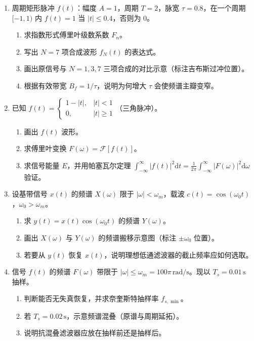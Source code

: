 \documentclass[11pt,a4paper]{ctexart}
\newcommand{\FT}{\mathcal{F}}
\newcommand{\dd}{\mathrm{d}}
\begin{document}
\begin{enumerate}[label=\textbf{题\arabic*.},leftmargin=*,itemsep=1.2em,start=8]

\item \label{q:8}
周期矩形脉冲 $f(t)$：幅度 $A=1$，周期 $T=2$，脉宽 $\tau=0.8$，在一个周期 $[-1,1)$ 内 $f(t)=1$ 当 $|t|\le 0.4$，否则为 $0$。
\begin{enumerate}[label=(\alph*)]
    \item 求指数形式傅里叶级数系数 $F_n$。
    \item 写出 $N=7$ 项合成波形 $f_N(t)$ 的表达式。
    \item 画出原信号与 $N=1,3,7$ 三项合成的对比示意（标注吉布斯过冲位置）。
    \item 根据有效带宽 $B_f=1/\tau$，说明为何增大 $\tau$ 会使频谱主瓣变窄。
\end{enumerate}

\item \label{q:9}
已知 $f(t)=\begin{cases}1-|t|,&|t|<1\\0,&|t|\ge 1\end{cases}$（三角脉冲）。
\begin{enumerate}[label=(\alph*)]
    \item 画出 $f(t)$ 波形。
    \item 求傅里叶变换 $F(\omega)=\FT[f(t)]$。
    \item 求信号能量 $E$，并用帕塞瓦尔定理 $\displaystyle\int_{-\infty}^{\infty}|f(t)|^2\dd t=\frac{1}{2\pi}\int_{-\infty}^{\infty}|F(\omega)|^2\dd\omega$ 验证。
\end{enumerate}

\item \label{q:10}
设基带信号 $x(t)$ 的频谱 $X(\omega)$ 限于 $|\omega|<\omega_m$，载波 $c(t)=\cos(\omega_0 t)$，$\omega_0>\omega_m$。
\begin{enumerate}[label=(\alph*)]
    \item 求 $y(t)=x(t)\cos(\omega_0 t)$ 的频谱 $Y(\omega)$。
    \item 画出 $X(\omega)$ 与 $Y(\omega)$ 的频谱搬移示意图（标注 $\pm\omega_0$ 位置）。
    \item 若要从 $y(t)$ 恢复 $x(t)$，说明理想低通滤波器的截止频率应如何选取。
\end{enumerate}

\item \label{q:11}
信号 $f(t)$ 的频谱 $F(\omega)$ 带限于 $|\omega|\le\omega_m=100\pi\,\mathrm{rad/s}$。现以 $T_s=0.01\,\mathrm{s}$ 抽样。
\begin{enumerate}[label=(\alph*)]
    \item 判断能否无失真恢复，并求奈奎斯特抽样率 $f_{s,\min}$。
    \item 若 $T_s=0.02\,\mathrm{s}$，示意频谱混叠（原谱与周期延拓）。
    \item 说明抗混叠滤波器应放在抽样前还是抽样后。
\end{enumerate}

\end{enumerate}
\end{document}
